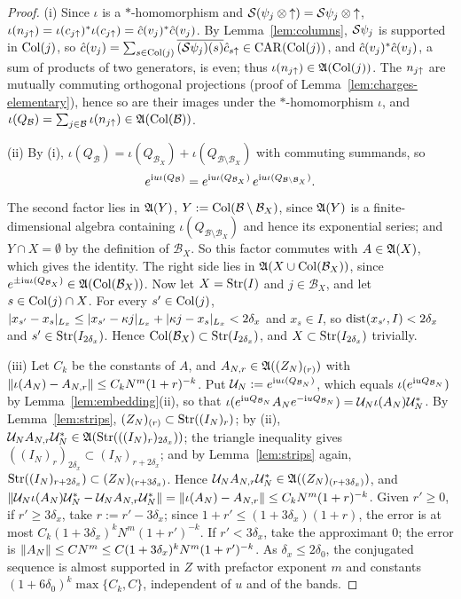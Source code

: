 \begin{proof}
(i) Since $\iota$ is a $*$-homomorphism and $\mathcal{S}(\psi_j\otimes{\uparrow})=\mathcal{S}\psi_j\otimes{\uparrow}$,
$\iota(n_{j{\uparrow}})=\iota(c_{j{\uparrow}})^*\iota(c_{j{\uparrow}})=\hat{c}(v_j)^*\hat{c}(v_j)$. By Lemma~\ref{lem:columns}, $\mathcal{S}\psi_j$ is supported
in $\mathrm{Col}(j)$, so $\hat{c}(v_j)=\sum_{s\in\mathrm{Col}(j)}\overline{(\mathcal{S}\psi_j)(s)}\hat{c}_{s{\uparrow}}\in\mathrm{CAR}(\mathrm{Col}(j))$, and
$\hat{c}(v_j)^*\hat{c}(v_j)$, a sum of products of two generators, is even; thus $\iota(n_{j{\uparrow}})\in\mathfrak{A}(\mathrm{Col}(j))$. The
$n_{j{\uparrow}}$ are mutually commuting orthogonal projections (proof of Lemma~\ref{lem:charges-elementary}), hence so are
their images under the $*$-homomorphism $\iota$, and
$\iota(Q_{\mathcal B})=\sum_{j\in\mathcal B}\iota(n_{j{\uparrow}})\in\mathfrak{A}(\mathrm{Col}(\mathcal B))$.

(ii) By (i), $\iota(Q_{\mathcal B})=\iota(Q_{\mathcal B_X})+\iota(Q_{\mathcal B\setminus\mathcal B_X})$ with commuting summands,
so
\[
e^{\mathrm{i} u\iota(Q_{\mathcal B})}=e^{\mathrm{i} u\iota(Q_{\mathcal B_X})}\,e^{\mathrm{i} u\iota(Q_{\mathcal B\setminus\mathcal B_X})}.
\]
The second factor lies in $\mathfrak{A}(Y)$, $Y:=\mathrm{Col}(\mathcal B\setminus\mathcal B_X)$, since $\mathfrak{A}(Y)$ is a finite-dimensional algebra
containing $\iota(Q_{\mathcal B\setminus\mathcal B_X})$ and hence its exponential series; and $Y\cap X=\emptyset$ by the
definition of $\mathcal B_X$. So this factor commutes with $A\in\mathfrak{A}(X)$, which gives the identity. The right side
lies in $\mathfrak{A}(X\cup\mathrm{Col}(\mathcal B_X))$, since $e^{\pm\mathrm{i} u\iota(Q_{\mathcal B_X})}\in\mathfrak{A}(\mathrm{Col}(\mathcal B_X))$. Now let
$X=\mathrm{Str}(I)$ and $j\in\mathcal B_X$, and let $s\in\mathrm{Col}(j)\cap X$. For every $s'\in\mathrm{Col}(j)$,
$\lvert x_{s'}-x_s\rvert_{L_x}\le\lvert x_{s'}-\kappa j\rvert_{L_x}+\lvert\kappa j-x_s\rvert_{L_x}<2\delta_x$ and $x_s\in I$, so
$\operatorname{dist}(x_{s'},I)<2\delta_x$ and $s'\in\mathrm{Str}(I_{2\delta_x})$. Hence $\mathrm{Col}(\mathcal B_X)\subset\mathrm{Str}(I_{2\delta_x})$, and
$X\subset\mathrm{Str}(I_{2\delta_x})$ trivially.

(iii) Let $C_k$ be the constants of $A$, and $A_{N,r}\in\mathfrak{A}((Z_N)_{(r)})$ with
$\lVert\iota(A_N)-A_{N,r}\rVert\le C_kN^m(1+r)^{-k}$. Put $\mathcal U_N:=e^{\mathrm{i} u\iota(Q_{\mathcal B_N})}$, which equals
$\iota(e^{\mathrm{i} uQ_{\mathcal B_N}})$ by Lemma~\ref{lem:embedding}(ii), so that
$\iota(e^{\mathrm{i} uQ_{\mathcal B_N}}A_Ne^{-\mathrm{i} uQ_{\mathcal B_N}})=\mathcal U_N\iota(A_N)\mathcal U_N^*$. By Lemma~\ref{lem:strips},
$(Z_N)_{(r)}\subset\mathrm{Str}((I_N)_r)$; by (ii), $\mathcal U_NA_{N,r}\mathcal U_N^*\in\mathfrak{A}(\mathrm{Str}(((I_N)_r)_{2\delta_x}))$; the triangle
inequality gives $((I_N)_r)_{2\delta_x}\subset(I_N)_{r+2\delta_x}$; and by Lemma~\ref{lem:strips} again,
$\mathrm{Str}((I_N)_{r+2\delta_x})\subset(Z_N)_{(r+3\delta_x)}$. Hence $\mathcal U_NA_{N,r}\mathcal U_N^*\in\mathfrak{A}((Z_N)_{(r+3\delta_x)})$, and
$\lVert\mathcal U_N\iota(A_N)\mathcal U_N^*-\mathcal U_NA_{N,r}\mathcal U_N^*\rVert=\lVert\iota(A_N)-A_{N,r}\rVert\le C_kN^m(1+r)^{-k}$. Given
$r'\ge0$, if $r'\ge3\delta_x$, take $r:=r'-3\delta_x$; since $1+r'\le(1+3\delta_x)(1+r)$, the error is at most
$C_k(1+3\delta_x)^kN^m(1+r')^{-k}$. If $r'<3\delta_x$, take the approximant $0$; the error is
$\lVert A_N\rVert\le CN^m\le C(1+3\delta_x)^kN^m(1+r')^{-k}$. As $\delta_x\le2\delta_0$, the conjugated sequence is almost
supported in $Z$ with prefactor exponent $m$ and constants $(1+6\delta_0)^k\max\{C_k,C\}$, independent of $u$ and of
the bands.
\end{proof}

